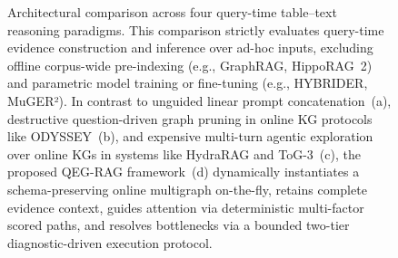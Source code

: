 \begin{figure}[t]
\centering
\resizebox{0.92\linewidth}{!}{}
\vspace{2.5mm}
\caption{Architectural comparison across four query-time table--text reasoning paradigms. This comparison strictly evaluates query-time evidence construction and inference over ad-hoc inputs, excluding offline corpus-wide pre-indexing (e.g., GraphRAG, HippoRAG~2) and parametric model training or fine-tuning (e.g., HYBRIDER, MuGER²). In contrast to unguided linear prompt concatenation~(a), destructive question-driven graph pruning in online KG protocols like ODYSSEY~(b), and expensive multi-turn agentic exploration over online KGs in systems like HydraRAG and ToG-3~(c), the proposed QEG-RAG framework~(d) dynamically instantiates a schema-preserving online multigraph on-the-fly, retains complete evidence context, guides attention via deterministic multi-factor scored paths, and resolves bottlenecks via a bounded two-tier diagnostic-driven execution protocol.}
\vspace{-2mm}
\label{fig:paradigms}
\end{figure}
